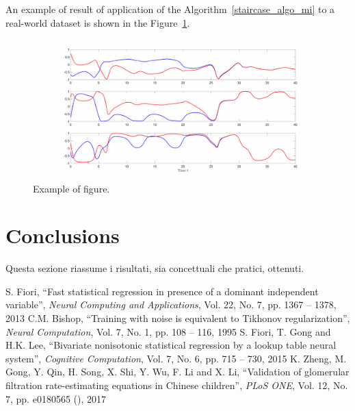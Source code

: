 \documentclass[10pt,final]{siamltex}
\begin{document}
An example of result of application of the Algorithm~\ref{staircase_algo_mi} to a real-world dataset is shown in the Figure~\ref{bodyfat}.

\vspace{5mm}
%
\begin{figure}[h!]
  \centering
  \includegraphics[scale=0.3]{Experiment1a}
  \caption{Example of figure.}
  \label{bodyfat}
\end{figure}
%
%
\section{Conclusions}\label{sec4}
%
{{\red Questa sezione riassume i risultati, sia concettuali che pratici, ottenuti.}}
%
\begin{thebibliography}{99}
   S. Fiori, ``Fast statistical regression in presence of a dominant independent variable'', \textit{Neural Computing and Applications}, Vol. 22, No. 7, pp. 1367 -- 1378, 2013
   C.M. Bishop, ``Training with noise is equivalent to Tikhonov regularization'', \textit{Neural Computation}, Vol. 7, No. 1, pp. 108 -- 116, 1995
   S. Fiori, T. Gong and H.K. Lee, ``Bivariate nonisotonic statistical regression by a lookup table neural system'', \textit{Cognitive Computation}, Vol. 7, No. 6, pp. 715 -- 730, 2015
   K. Zheng, M. Gong, Y. Qin, H. Song, X. Shi, Y. Wu, F. Li and X. Li, ``Validation of glomerular filtration rate-estimating equations in Chinese children'', \textit{PLoS ONE}, Vol. 12, No. 7, pp. e0180565 (), 2017
\end{thebibliography}
\end{document}
